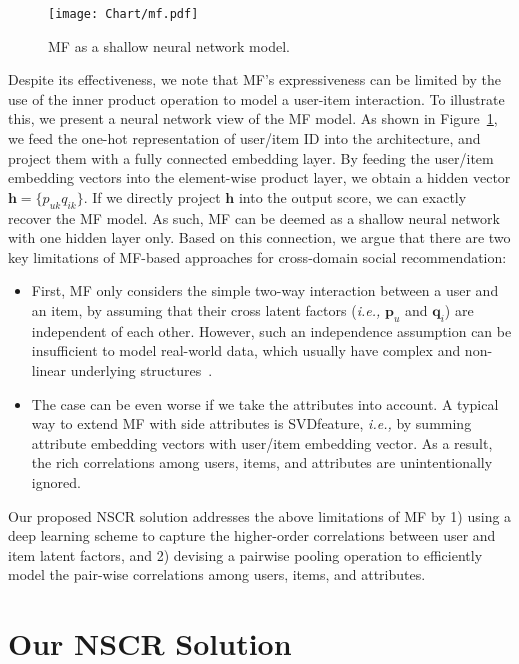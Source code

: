 \documentclass[sigconf]{acmart}
\newcommand{\Mat}[1]{\mathbf{#1}}
\newcommand{\ie}{\emph{i.e., }}
\begin{document}
\begin{figure}
	\centering
\texttt{[image: Chart/mf.pdf]}
	\vspace{-5pt}
	\caption{MF as a shallow neural network model.}\label{fig:mf_limit}
	\vspace{-1em}
\end{figure}

Despite its effectiveness, we note that MF's expressiveness can be limited by the use of the inner product operation to model a user-item interaction. To illustrate this, we present a neural network view of the MF model. As shown in Figure~\ref{fig:mf_limit},  we feed the one-hot representation of user/item ID into the architecture, and project them with a fully connected embedding layer. By feeding the user/item embedding vectors into the element-wise product layer, we obtain a hidden vector $\textbf{h}=\{p_{uk}q_{ik}\}$.
If we directly project $\textbf{h}$ into the output score, we can exactly recover the MF model.
As such, MF can be deemed as a shallow neural network with one hidden layer only. Based on this connection, we argue that there are two key limitations of MF-based approaches for cross-domain social recommendation:
\begin{itemize}[leftmargin=*]	
	\item First, MF only considers the simple two-way interaction between a user and an item, by assuming that their cross latent factors (\ie $\Mat{p}_{u}$ and $\Mat{q}_{i}$) are independent of each other. However, such an independence assumption can be insufficient to model real-world data,
which usually have complex and non-linear underlying structures~\cite{he2017neural,SNE}.
	\item The case can be even worse if we take the attributes into account. A typical way to extend MF with side attributes is SVDfeature, \ie by summing attribute embedding vectors with user/item embedding vector. As a result, the rich correlations among users, items, and attributes are unintentionally ignored.
\end{itemize}

\noindent Our proposed NSCR solution addresses the above limitations of MF by 1) using a deep learning scheme to capture the higher-order correlations between user and item latent factors, and 2) devising a pairwise pooling operation to efficiently model the pair-wise correlations among users, items, and attributes.


\section{Our NSCR Solution}
\end{document}
